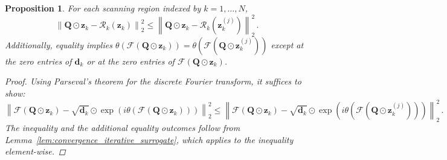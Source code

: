 \documentclass{article}
\numberwithin{equation}{section}
\newtheorem{proposition}[theorem]{Proposition}
\begin{document}
\begin{proposition}\label{prop:convergence_iterative_surrogate}
For each scanning region indexed by $k=1,\dots,N$,
\begin{equation*}
    \left\|\bm{Q}\odot\bm{z}_k - \mathcal{R}_k\left(\bm{z}_k\right)\right\|_2^2\leq \left\|\bm{Q}\odot\bm{z}_k - \mathcal{R}_k\left(\bm{z}^{(j)}_k\right)\right\|_2^2\,.
\end{equation*}
Additionally, equality implies $\theta\left(\mathcal{F}\left(\bm{Q}\odot \bm{z}_k\right)\right) = \theta\left(\mathcal{F}\left(\bm{Q}\odot \bm{z}_k^{(j)}\right)\right)$ except at the zero entries of $\bm{d}_k$ or at the zero entries of $\mathcal{F}\left(\bm{Q}\odot \bm{z}_k\right)$.

\begin{proof}
    Using Parseval’s theorem for the discrete Fourier transform, it suffices to show:
    \begin{equation*}
        \left\|\mathcal{F}\left(\bm{Q}\odot \bm{z}_k\right) - \sqrt{\bm{d}_k} \odot\exp\left(i \theta\left(\mathcal{F}\left(\bm{Q}\odot \bm{z}_k\right)\right)\right)\right\|_2^2\leq \left\|\mathcal{F}\left(\bm{Q}\odot \bm{z}_k\right) - \sqrt{\bm{d}_k}\odot\exp\left(i \theta\left(\mathcal{F}\left(\bm{Q}\odot \bm{z}_k^{(j)}\right)\right)\right)\right\|_2^2\,.
    \end{equation*}
    The inequality and the additional equality outcomes follow from Lemma~\ref{lem:convergence_iterative_surrogate}, which applies to the inequality element-wise. 
\end{proof}
\end{proposition}
\end{document}
